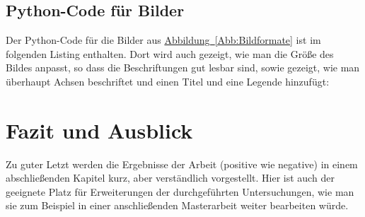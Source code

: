 \documentclass[12pt]{article}
\theoremstyle{definition}
\numberwithin{equation}{section}
\begin{document}
\subsection{Python-Code für Bilder}
\label{sec:Python_Bilder}

Der Python-Code für die Bilder aus
\hyperref[Abb:Bildformate]{Abbildung~\ref*{Abb:Bildformate}} ist
im folgenden Listing enthalten. Dort wird auch gezeigt, wie man die
Größe des Bildes anpasst, so dass die Beschriftungen gut lesbar sind,
sowie gezeigt, wie man überhaupt Achsen beschriftet und einen Titel
und eine Legende hinzufügt:
\medskip


\section{Fazit und Ausblick}
\label{sec:FazitAusblick}

Zu guter Letzt werden die Ergebnisse der Arbeit (positive wie
negative) in einem abschließenden Kapitel kurz, aber verständlich
vorgestellt. Hier ist auch der geeignete Platz für Erweiterungen der
durchgeführten Untersuchungen, wie man sie zum Beispiel in einer
anschließenden Masterarbeit weiter bearbeiten würde.

\printbibliography
\end{document}
